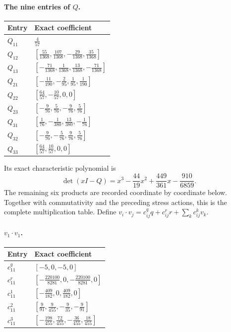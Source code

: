 \paragraph{The nine entries of $Q$.}
\begin{longtable}{@{}ll@{}}
\toprule
Entry&Exact coefficient\\
\midrule\endhead
$Q_{11}$&$\frac{4}{57}$\\[3pt]
$Q_{12}$&$[\frac{55}{1368},\frac{107}{1368},-\frac{29}{1368},\frac{35}{1368}]$\\[3pt]
$Q_{13}$&$[-\frac{71}{1368},\frac{1}{1368},\frac{13}{1368},-\frac{71}{1368}]$\\[3pt]
$Q_{21}$&$[-\frac{11}{190},-\frac{2}{95},\frac{1}{95},\frac{1}{190}]$\\[3pt]
$Q_{22}$&$[\frac{64}{57},-\frac{10}{57},0,0]$\\[3pt]
$Q_{23}$&$[-\frac{9}{76},\frac{5}{76},-\frac{9}{76},\frac{5}{76}]$\\[3pt]
$Q_{31}$&$[\frac{1}{76},-\frac{1}{380},\frac{13}{380},-\frac{1}{76}]$\\[3pt]
$Q_{32}$&$[-\frac{9}{76},-\frac{5}{76},\frac{9}{76},\frac{5}{76}]$\\[3pt]
$Q_{33}$&$[\frac{64}{57},\frac{10}{57},0,0]$\\[3pt]
\bottomrule
\end{longtable}
Its exact characteristic polynomial is
\[
 \det(xI-Q)=x^3-\frac{44}{19}x^2+\frac{449}{361}x-\frac{910}{6859}.
\]
The remaining six products are recorded coordinate by coordinate below.
Together with commutativity and the preceding stress actions, this is
the complete multiplication table. Define
$v_i\cdot v_j=c^q_{ij}q+c^r_{ij}r+\sum_k c^k_{ij}v_k$.
\paragraph{$v_1\cdot v_1$.}
\begin{longtable}{@{}ll@{}}
\toprule
Entry&Exact coefficient\\
\midrule\endhead
$c^{q}_{11}$&$[-5,0,-5,0]$\\[3pt]
$c^{r}_{11}$&$[-\frac{220100}{8281},0,-\frac{220100}{8281},0]$\\[3pt]
$c^{1}_{11}$&$[-\frac{409}{182},0,\frac{409}{182},0]$\\[3pt]
$c^{2}_{11}$&$[\frac{9}{91},\frac{9}{455},-\frac{9}{35},-\frac{9}{91}]$\\[3pt]
$c^{3}_{11}$&$[-\frac{198}{455},\frac{72}{455},-\frac{36}{455},\frac{18}{455}]$\\[3pt]
\bottomrule
\end{longtable}
